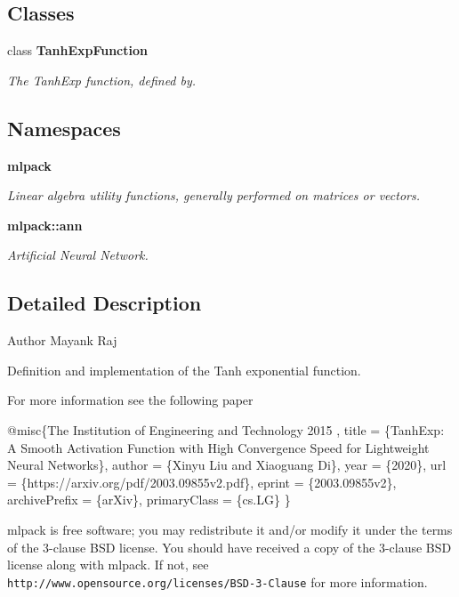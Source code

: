 \subsection*{Classes}
\begin{DoxyCompactItemize}
\item 
class \textbf{ Tanh\+Exp\+Function}
\begin{DoxyCompactList}\small\item\em The Tanh\+Exp function, defined by. \end{DoxyCompactList}\end{DoxyCompactItemize}
\subsection*{Namespaces}
\begin{DoxyCompactItemize}
\item 
 \textbf{ mlpack}
\begin{DoxyCompactList}\small\item\em Linear algebra utility functions, generally performed on matrices or vectors. \end{DoxyCompactList}\item 
 \textbf{ mlpack\+::ann}
\begin{DoxyCompactList}\small\item\em Artificial Neural Network. \end{DoxyCompactList}\end{DoxyCompactItemize}


\subsection{Detailed Description}
\begin{DoxyAuthor}{Author}
Mayank Raj
\end{DoxyAuthor}
Definition and implementation of the Tanh exponential function.

For more information see the following paper


\begin{DoxyCode}
@misc\{The Institution of Engineering and Technology 2015 ,
   title = \{TanhExp: A Smooth Activation Function with High Convergence Speed
            \textcolor{keywordflow}{for} Lightweight Neural Networks\},
   author = \{Xinyu Liu and Xiaoguang Di\},
   year = \{2020\},
   url = \{https:\textcolor{comment}{//arxiv.org/pdf/2003.09855v2.pdf\},}
   eprint = \{2003.09855v2\},
   archivePrefix = \{arXiv\},
   primaryClass = \{cs.LG\} \}
\end{DoxyCode}


mlpack is free software; you may redistribute it and/or modify it under the terms of the 3-\/clause B\+SD license. You should have received a copy of the 3-\/clause B\+SD license along with mlpack. If not, see {\tt http\+://www.\+opensource.\+org/licenses/\+B\+S\+D-\/3-\/\+Clause} for more information. 